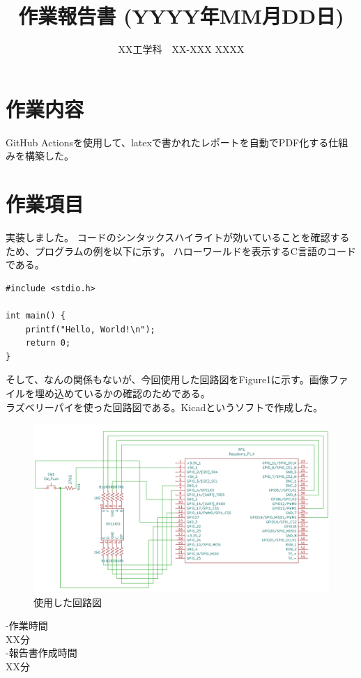 \documentclass[12pt]{article}
\title{作業報告書 (YYYY年MM月DD日)}
\author{XX工学科　XX-XXX XXXX}
\begin{document}
\maketitle

\section{作業内容}
GitHub Actionsを使用して、latexで書かれたレポートを自動でPDF化する仕組みを構築した。\\

\section{作業項目}
実装しました。
コードのシンタックスハイライトが効いていることを確認するため、プログラムの例を以下に示す。
ハローワールドを表示するC言語のコードである。

\begin{verbatim}
#include <stdio.h>

int main() {
    printf("Hello, World!\n");
    return 0;
}

\end{verbatim}

そして、なんの関係もないが、今回使用した回路図をFigure1に示す。画像ファイルを埋め込めているかの確認のためである。\\
ラズベリーパイを使った回路図である。Kicadというソフトで作成した。

\begin{figure}[htbp]
  \centering
  \includegraphics[width=0.8\linewidth]{images/circuit.png}
  \caption{使用した回路図}
  \label{fig:example}
\end{figure}


\noindent
-作業時間\\
    XX分\\
-報告書作成時間\\
    XX分
\end{document}

